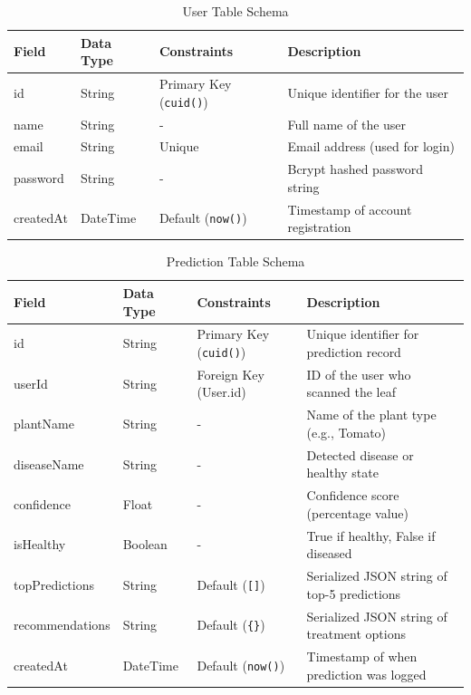\documentclass[12pt, a4paper]{report}
\begin{document}
\begin{table}[H]
\centering
\caption{User Table Schema}
\vspace{0.3cm}
\begin{tabular}{llll}
\toprule
\textbf{Field} & \textbf{Data Type} & \textbf{Constraints} & \textbf{Description} \\
\midrule
id & String & Primary Key (\texttt{cuid()}) & Unique identifier for the user \\
name & String & - & Full name of the user \\
email & String & Unique & Email address (used for login) \\
password & String & - & Bcrypt hashed password string \\
createdAt & DateTime & Default (\texttt{now()}) & Timestamp of account registration \\
\bottomrule
\end{tabular}
\label{tab:user_schema}
\end{table}

\begin{table}[H]
\centering
\caption{Prediction Table Schema}
\vspace{0.3cm}
\begin{tabular}{llll}
\toprule
\textbf{Field} & \textbf{Data Type} & \textbf{Constraints} & \textbf{Description} \\
\midrule
id & String & Primary Key (\texttt{cuid()}) & Unique identifier for prediction record \\
userId & String & Foreign Key (User.id) & ID of the user who scanned the leaf \\
plantName & String & - & Name of the plant type (e.g., Tomato) \\
diseaseName & String & - & Detected disease or healthy state \\
confidence & Float & - & Confidence score (percentage value) \\
isHealthy & Boolean & - & True if healthy, False if diseased \\
topPredictions & String & Default (\texttt{[]}) & Serialized JSON string of top-5 predictions \\
recommendations & String & Default (\texttt{\{\}}) & Serialized JSON string of treatment options \\
createdAt & DateTime & Default (\texttt{now()}) & Timestamp of when prediction was logged \\
\bottomrule
\end{tabular}
\label{tab:prediction_schema}
\end{table}
\end{document}
